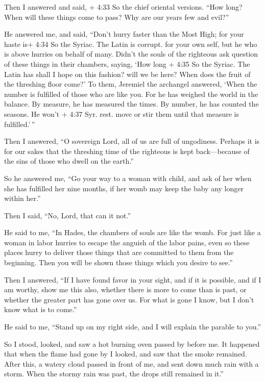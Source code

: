  Then I answered and said, + 4:33 So the chief oriental
versions. ``How long? When will these things come to pass? Why are our
years few and evil?''

 He answered me, and said, ``Don't hurry faster than the
Most High; for your haste is+ 4:34 So the Syriac. The Latin is corrupt.
for your own self, but he who is above hurries on behalf of many.
 Didn't the souls of the righteous ask question of these
things in their chambers, saying, `How long + 4:35 So the Syriac. The
Latin has shall I hope on this fashion? will we be here? When does the
fruit of the threshing floor come?'  To them, Jeremiel the
archangel answered, `When the number is fulfilled of those who are like
you. For he has weighed the world in the balance.  By
measure, he has measured the times. By number, he has counted the
seasons. He won't + 4:37 Syr. rest. move or stir them until that measure
is fulfilled.'\,''

 Then I answered, ``O sovereign Lord, all of us are full of
ungodiness.  Perhaps it is for our sakes that the threshing
time of the righteous is kept back---because of the sins of those who
dwell on the earth.''

 So he answered me, ``Go your way to a woman with child,
and ask of her when she has fulfilled her nine months, if her womb may
keep the baby any longer within her.''

 Then I said, ``No, Lord, that can it not.''

He said to me, ``In Hades, the chambers of souls are like the womb.
 For just like a woman in labor hurries to escape the
anguish of the labor pains, even so these places hurry to deliver those
things that are committed to them from the beginning.  Then
you will be shown those things which you desire to see.''

 Then I answered, ``If I have found favor in your sight,
and if it is possible, and if I am worthy,  show me this
also, whether there is more to come than is past, or whether the greater
part has gone over us.  For what is gone I know, but I
don't know what is to come.''

 He said to me, ``Stand up on my right side, and I will
explain the parable to you.''

 So I stood, looked, and saw a hot burning oven passed by
before me. It happened that when the flame had gone by I looked, and saw
that the smoke remained.  After this, a watery cloud passed
in front of me, and sent down much rain with a storm. When the stormy
rain was past, the drops still remained in it.''

